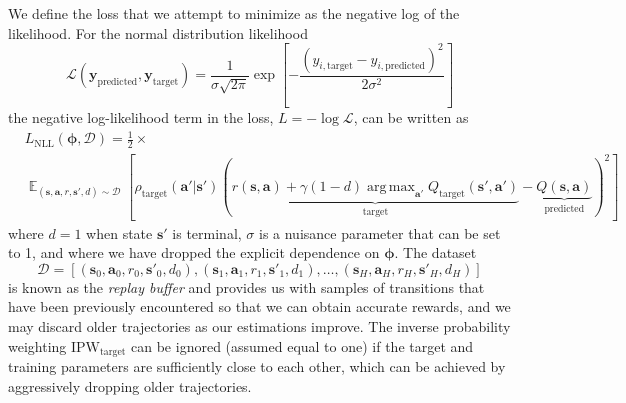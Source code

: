 \documentclass{article}
\DeclareMathOperator*{\argmax}{arg\,max}
\begin{document}
We define the loss that we attempt to minimize as the negative log of the likelihood. For the normal distribution likelihood
\begin{equation}
\mathcal{L}(\mathbf{y}_\text{predicted},\mathbf{y}_\text{target})=\frac{1}{\sigma\sqrt{2\pi}}\exp[-\frac{(y_{i,\text{target}}-y_{i,\text{predicted}})^2}{2\sigma^2}]
\end{equation}
the negative log-likelihood term in the loss, $L=-\log\mathcal{L}$, can be written as \begin{equation}\begin{split}\label{eq:likelihood_trajectory}&L_\text{NLL}(\boldsymbol{\phi},\mathcal{D})=\frac{1}{2}\times\\&\mathop{\mathbb{E}}_{(\mathbf{s},\mathbf{a},r,\mathbf{s}',d)\sim\mathcal{D}}\left[\rho_\text{target}(\mathbf{a}'|\mathbf{s}')\left(\underbrace{r(\mathbf{s},\mathbf{a})+\gamma(1-d)\argmax_{\mathbf{a}'}Q_{\text{target}}(\mathbf{s}',\mathbf{a}')}_\text{target}-\underbrace{Q(\mathbf{s},\mathbf{a})}_\text{predicted}\right)^2\right]\end{split}\end{equation}where $d=1$ when state $\mathbf{s}'$ is terminal,  $\sigma$ is a nuisance parameter that can be set to 1, and where we have dropped the explicit dependence on $\boldsymbol{\phi}$.  The dataset \begin{equation}\mathcal{D}=[(\mathbf{s}_0,\mathbf{a}_0,r_0,\mathbf{s}'_0,d_0),(\mathbf{s}_1,\mathbf{a}_1,r_1,\mathbf{s}'_1,d_1),\dots,(\mathbf{s}_H,\mathbf{a}_H,r_H,\mathbf{s}'_H,d_H)]\end{equation}is known as the \textit{replay buffer} and provides us with samples of transitions that have been previously encountered so that we can obtain accurate rewards, and we may discard older trajectories as our estimations improve. The inverse probability weighting $\text{IPW}_\text{target}$ can be ignored (assumed equal to one) if the target and training parameters are sufficiently close to each other, which can be achieved by aggressively dropping older trajectories.
\end{document}

